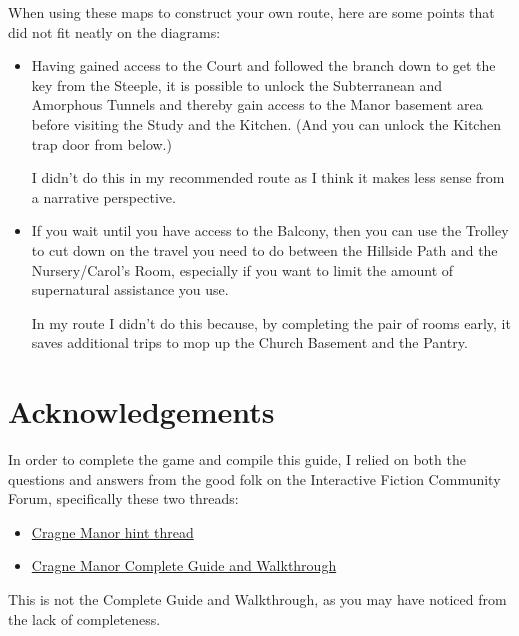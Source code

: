 \documentclass[a5paper]{extarticle}
\begin{document}
\newpage
When using these maps to construct your own route,
here are some points that did not fit neatly on the diagrams:

\begin{itemize}
\item
  Having gained access to the Court and followed the branch down to get the key
  from the Steeple, it is possible to unlock the Subterranean and Amorphous Tunnels
  and thereby gain access to the Manor basement area before visiting the Study
  and the Kitchen. (And you can unlock the Kitchen trap door from below.)

  I didn't do this in my recommended route as I think it makes less sense from
  a narrative perspective.

\item
  If you wait until you have access to the Balcony, then you can use the Trolley
  to cut down on the travel you need to do between the Hillside Path and the
  Nursery\slash Carol's Room, especially if you want to limit the amount of
  supernatural assistance you use.

  In my route I didn't do this because, by completing the pair of rooms early,
  it saves additional trips to mop up the Church Basement and the Pantry.
\end{itemize}

\newpage
\section{Acknowledgements}\label{sec:ack}

In order to complete the game and compile this guide, I relied on both the
questions and answers from the good folk on the Interactive Fiction Community
Forum, specifically these two threads:

\begin{itemize}
\item
  \href{https://intfiction.org/t/cragne-manor-hint-thread/13961}{Cragne Manor hint thread}
\item
  \href{https://intfiction.org/t/cragne-manor-complete-guide-and-walkthrough/14019}{Cragne Manor Complete Guide and Walkthrough}
\end{itemize}

This is not the Complete Guide and Walkthrough, as you may have noticed from the lack of completeness.
\end{document}
